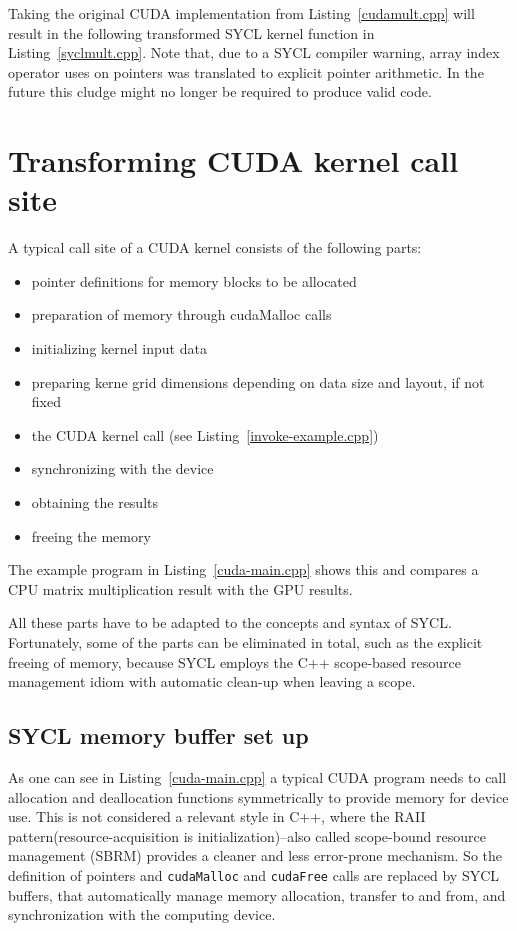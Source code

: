 \documentclass[sigconf]{acmart}
\newcommand{\inputcode}[2]{}
\newcommand{\inputsycl}[2]{}
\newcommand{\tcode}[1]{\texttt{#1}}
\begin{document}
Taking the original CUDA implementation from Listing~\ref{cudamult.cpp} will result in the following transformed SYCL kernel function in Listing~\ref{syclmult.cpp}. Note that, due to a SYCL compiler warning, array index operator uses on pointers was translated to explicit pointer arithmetic. In the future this cludge might no longer be required to produce valid code.
\inputcode{cudamult.cpp}{CUDA matrix multiplication kernel}
\inputsycl{syclmult.cpp}{Transformed SYCL kernel function}

\section{Transforming CUDA kernel call site}
A typical call site of a CUDA kernel consists of the following parts:
\begin{itemize}
\item pointer definitions for memory blocks to be allocated
\item preparation of memory through cudaMalloc calls
\item initializing kernel input data
\item preparing kerne grid dimensions depending on data size and layout, if not fixed
\item the CUDA kernel call (see Listing~\ref{invoke-example.cpp})
\item synchronizing with the device
\item obtaining the results
\item freeing the memory
\end{itemize}
The example program in Listing~\ref{cuda-main.cpp} shows this and compares a CPU matrix multiplication result with the GPU results.

All these parts have to be adapted to the concepts and syntax of SYCL. Fortunately, some of the parts can be eliminated in total, such as the explicit freeing of memory, because SYCL employs the C++ scope-based resource management idiom with automatic clean-up when leaving a scope.

\subsection{SYCL memory buffer set up}
As one can see in Listing~\ref{cuda-main.cpp} a typical CUDA program needs to call allocation and deallocation functions symmetrically to provide memory for device use. This is not considered a relevant style in C++, where the RAII pattern(resource-acquisition is initialization)--also called scope-bound resource management (SBRM) provides a cleaner and less error-prone mechanism. So the definition of pointers and \tcode{cudaMalloc} and \tcode{cudaFree} calls are replaced by SYCL buffers, that automatically manage memory allocation, transfer to and from, and synchronization with the computing device.
\end{document}
